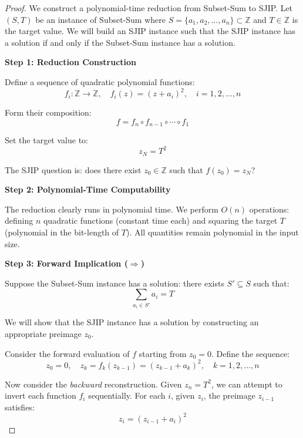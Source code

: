 \documentclass[12pt,a4paper]{article}
\newcommand{\Z}{\mathbb{Z}}
\begin{document}
\begin{proof}
We construct a polynomial-time reduction from Subset-Sum to SJIP. Let $(S, T)$ be an instance of Subset-Sum where $S = \{a_1, a_2, \ldots, a_n\} \subset \Z$ and $T \in \Z$ is the target value. We will build an SJIP instance such that the SJIP instance has a solution if and only if the Subset-Sum instance has a solution.

\textbf{Step 1: Reduction Construction}

Define a sequence of quadratic polynomial functions:
\begin{equation}
f_i: \Z \to \Z, \quad f_i(z) = (z + a_i)^2, \quad i = 1, 2, \ldots, n
\end{equation}

Form their composition:
\begin{equation}
f = f_n \circ f_{n-1} \circ \cdots \circ f_1
\end{equation}

Set the target value to:
\begin{equation}
z_N = T^2
\end{equation}

The SJIP question is: does there exist $z_0 \in \Z$ such that $f(z_0) = z_N$?

\textbf{Step 2: Polynomial-Time Computability}

The reduction clearly runs in polynomial time. We perform $O(n)$ operations: defining $n$ quadratic functions (constant time each) and squaring the target $T$ (polynomial in the bit-length of $T$). All quantities remain polynomial in the input size.

\textbf{Step 3: Forward Implication ($\Rightarrow$)}

Suppose the Subset-Sum instance has a solution: there exists $S' \subseteq S$ such that:
\begin{equation}
\sum_{a_i \in S'} a_i = T
\end{equation}

We will show that the SJIP instance has a solution by constructing an appropriate preimage $z_0$.

Consider the forward evaluation of $f$ starting from $z_0 = 0$. Define the sequence:
\begin{equation}
z_0 = 0, \quad z_k = f_k(z_{k-1}) = (z_{k-1} + a_k)^2, \quad k = 1, 2, \ldots, n
\end{equation}

Now consider the \emph{backward} reconstruction. Given $z_n = T^2$, we can attempt to invert each function $f_i$ sequentially. For each $i$, given $z_i$, the preimage $z_{i-1}$ satisfies:
\begin{equation}
z_i = (z_{i-1} + a_i)^2
\end{equation}


\end{proof}
\end{document}
